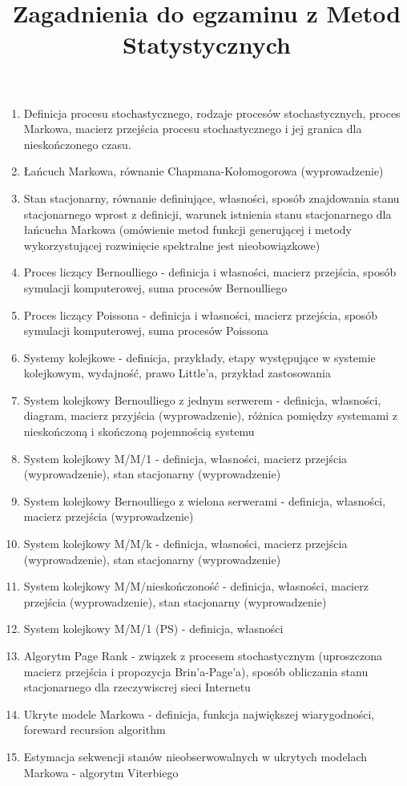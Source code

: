 \documentclass[a4paper]{article}
\title{Zagadnienia do egzaminu z Metod Statystycznych}
\author{}
\date{}
\begin{document}
\maketitle

\begin{enumerate}
  \item Definicja procesu stochastycznego, rodzaje procesów stochastycznych, proces Markowa, macierz przejścia procesu stochastycznego i jej granica dla nieskończonego czasu.
  \item Łańcuch Markowa, równanie Chapmana-Kołomogorowa (wyprowadzenie)
  \item Stan stacjonarny, równanie definiujące, własności, sposób znajdowania stanu stacjonarnego wprost z definicji, warunek istnienia stanu stacjonarnego dla łańcucha Markowa (omówienie metod funkcji generującej i metody wykorzystującej rozwinięcie spektralne jest nieobowiązkowe)
  \item Proces liczący Bernoulliego - definicja i własności, macierz przejścia, sposób symulacji komputerowej, suma procesów Bernoulliego
  \item Proces liczący Poissona - definicja i własności, macierz przejścia, sposób symulacji komputerowej, suma procesów Poissona
  \item Systemy kolejkowe - definicja, przykłady, etapy występujące w systemie kolejkowym, wydajność, prawo Little'a, przykład zastosowania
  \item System kolejkowy Bernoulliego z jednym serwerem - definicja, własności, diagram, macierz przyjścia (wyprowadzenie), różnica pomiędzy systemami z nieskończoną i skończoną pojemnością systemu
  \item System kolejkowy M/M/1 - definicja, własności, macierz przejścia (wyprowadzenie), stan stacjonarny (wyprowadzenie)
  \item System kolejkowy Bernoulliego z wielona serwerami - definicja, własności, macierz przejścia (wyprowadzenie)
  \item System kolejkowy M/M/k - definicja, własności, macierz przejścia (wyprowadzenie), stan stacjonarny (wyprowadzenie)
  \item System kolejkowy M/M/nieskończoność - definicja, własności, macierz przejścia (wyprowadzenie), stan stacjonarny (wyprowadzenie)
  \item System kolejkowy M/M/1 (PS) - definicja, własności
  \item Algorytm Page Rank - związek z procesem stochastycznym (uproszczona macierz przejścia i propozycja Brin'a-Page'a), sposób obliczania stanu stacjonarnego dla rzeczywiscrej sieci Internetu
  \item Ukryte modele Markowa - definicja, funkcja największej wiarygodności, foreward recursion algorithm
  \item Estymacja sekwencji stanów nieobserwowalnych w ukrytych modelach Markowa - algorytm Viterbiego
\end{enumerate}
\end{document}

